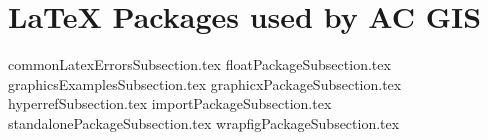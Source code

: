 \documentclass[class=article , crop=false, titlepage, twoside, multi={itemize, figure, verbatim}, float=false]{standalone}
\title{}  %
\begin{document}
\ifstandalone
\maketitle %
\clearpage
\tableofcontents %
\clearpage
\fi

\section[\LaTeX{} Packages]{\LaTeX{} Packages used by AC GIS}
{commonLatexErrorsSubsection.tex}
{floatPackageSubsection.tex}
{graphicsExamplesSubsection.tex}
{graphicxPackageSubsection.tex}
{hyperrefSubsection.tex}
{importPackageSubsection.tex}
{standalonePackageSubsection.tex}
{wrapfigPackageSubsection.tex}
\end{document}
